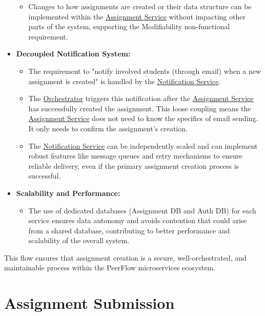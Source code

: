 \begin{itemize}
\begin{itemize}
        \item Changes to how assignments are created or their data structure can be implemented within the \hyperref[def:AssignmentService]{Assignment Service} without impacting other parts of the system, supporting the Modifiability non-functional requirement.
    \end{itemize}
    \item \textbf{Decoupled Notification System:}
    \begin{itemize}
        \item The requirement to "notify involved students (through email) when a new assignment is created" is handled by the \hyperref[def:NotificationService]{Notification Service}.
        \item The \hyperref[def:Orchestrator]{Orchestrator} triggers this notification after the \hyperref[def:AssignmentService]{Assignment Service} has successfully created the assignment. This loose coupling means the \hyperref[def:AssignmentService]{Assignment Service} does not need to know the specifics of email sending. It only needs to confirm the assignment's creation.
        \item The \hyperref[def:NotificationService]{Notification Service} can be independently scaled and can implement robust features like message queues and retry mechanisms to ensure reliable delivery, even if the primary assignment creation process is successful.
    \end{itemize}
    \item \textbf{Scalability and Performance:}
    \begin{itemize}
        \item The use of dedicated databases (Assignment DB and Auth DB) for each service ensures data autonomy and avoids contention that could arise from a shared database, contributing to better performance and scalability of the overall system.
    \end{itemize}
\end{itemize}
\begin{justify}
    This flow ensures that assignment creation is a secure, well-orchestrated, and maintainable process within the PeerFlow microservices ecosystem.
\end{justify}

\clearpage

\section{Assignment Submission}

